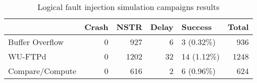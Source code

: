 \begin{table}[H]
\centering
\caption{Logical fault injection simulation campaigns results}
\label{table:end_sim_by_status_wop_multi_bitflip_reg}
\begin{tabular}{lrrrlr}
\toprule
 & Crash & NSTR & Delay & Success & Total \\
\midrule
Buffer Overflow & 0 & 927 & 6 & 3 (0.32\%) & 936 \\
WU-FTPd & 0 & 1202 & 32 & 14 (1.12\%) & 1248 \\
Compare/Compute & 0 & 616 & 2 & 6 (0.96\%) & 624 \\
\bottomrule
\end{tabular}
\end{table}
